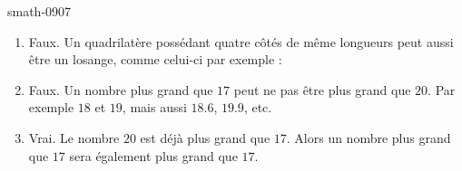 
\begin{corrige}{smath-0907}

    \begin{enumerate}
        \item
            Faux. Un quadrilatère possédant quatre côtés de même longueurs peut aussi être un losange, comme celui-ci par exemple :
            \begin{center}
                
            \end{center}
        \item
            Faux. Un nombre plus grand que \( 17\) peut ne pas être plus grand que \( 20\). Par exemple \( 18\) et \( 19\), mais aussi \( 18.6\), \( 19.9\), etc.
        \item
            Vrai. Le nombre \( 20\) est déjà plus grand que \( 17\). Alors un nombre plus grand que \( 17\) sera également plus grand que \( 17\).
    \end{enumerate}
\end{corrige}
